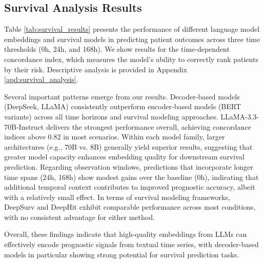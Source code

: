 \subsection{Survival Analysis Results}

Table \ref{tab:survival_results} presents the performance of different language model embeddings and survival models in predicting patient outcomes across three time thresholds (0h, 24h, and 168h). We show results for the time-dependent concordance index, which measures the model's ability to correctly rank patients by their risk. 
Descriptive analysis is provided in Appendix \ref{apd:survival_analysis}.

Several important patterns emerge from our results.
Decoder-based models (DeepSeek, LLaMA) consistently outperform encoder-based models (BERT variants) across all time horizons and survival modeling approaches.
LLaMA-3.3-70B-Instruct delivers the strongest performance overall, achieving concordance indices above 0.82 in most scenarios.
Within each model family, larger architectures (e.g., 70B vs. 8B) generally yield superior results, suggesting that greater model capacity enhances embedding quality for downstream survival prediction. Regarding observation windows, predictions that incorporate longer time spans (24h, 168h) show modest gains over the baseline (0h), indicating that additional temporal context contributes to improved prognostic accuracy, albeit with a relatively small effect.
In terms of survival modeling frameworks, DeepSurv and DeepHit exhibit comparable performance across most conditions, with no consistent advantage for either method.

Overall, these findings indicate that high-quality embeddings from LLMs can effectively encode prognostic signals from textual time series, with decoder-based models in particular showing strong potential for survival prediction tasks.

